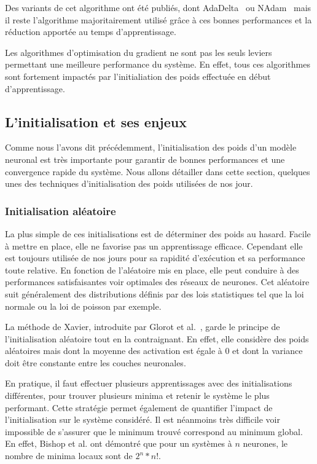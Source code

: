 Des variants de cet algorithme ont été publiés, dont AdaDelta~\cite{Zeiler2012} ou NAdam~\cite{Dozat2016} mais il reste l'algorithme majoritairement utilisé grâce à ces bonnes performances et la réduction apportée au temps d'apprentissage.

Les algorithmes d'optimisation du gradient ne sont pas les seuls leviers permettant une meilleure performance du système. En effet, tous ces algorithmes sont fortement impactés par l'initialiation des poids effectuée en début d'apprentissage.

\subsection{L'initialisation et ses enjeux}
Comme nous l'avons dit précédemment, l'initialisation des poids d'un modèle neuronal est très importante pour garantir de bonnes performances et une convergence rapide du système. Nous allons détailler dans cette section, quelques unes des techniques d'initialisation des poids utilisées de nos jour.


\subsubsection{Initialisation aléatoire}
La plus simple de ces initialisations est de déterminer des poids au hasard. Facile à mettre en place, elle ne favorise pas un apprentissage efficace. Cependant elle est toujours utilisée de nos jours pour sa rapidité d'exécution et sa performance toute relative. En fonction de l'aléatoire mis en place, elle peut conduire à des performances satisfaisantes voir optimales des réseaux de neurones. Cet aléatoire suit généralement des distributions définis par des lois statistiques tel que la loi normale ou la loi de poisson par exemple.

La méthode de Xavier, introduite par Glorot et al.~\cite{Glorot2010}, garde le principe de l'initialisation aléatoire tout en la contraignant. En effet, elle considère des poids aléatoires mais dont la moyenne des activation est égale à 0 et dont la variance doit être constante entre les couches neuronales.

En pratique, il faut effectuer plusieurs apprentissages avec des initialisations différentes, pour trouver plusieurs minima et retenir le système le plus performant. Cette stratégie permet également de quantifier l'impact de l'initialisation sur le système considéré. Il est néanmoins très difficile voir impossible de s'assurer que le minimum trouvé correspond au minimum global. En effet, Bishop et al. ont démontré que pour un systèmes à $n$ neurones, le nombre de minima locaux sont de $2^n*n!$.

